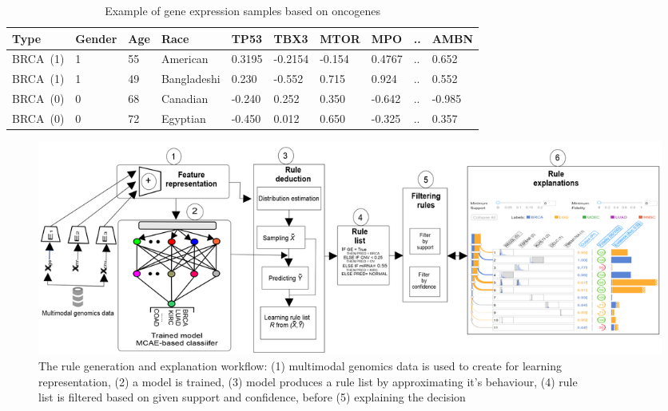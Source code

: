 \begin{table}[h!]
    \caption{Example of gene expression samples based on oncogenes}
    \label{ge:ancor_example}
    \vspace{-6mm}
    \begin{center}
        \scriptsize
        \begin{tabular}{l|l|l|l|l|l|l|l|l|l}
            \hline
            \rowcolor{Gray}
            \textbf{Type} & \textbf{Gender} & \textbf{Age} & \textbf{Race} & \textbf{TP53} & \textbf{TBX3} & \textbf{MTOR} & \textbf{MPO}  & .. & \textbf{AMBN} \\\hline    
            BRCA~(1) & 1 & 55 & American & 0.3195 & -0.2154 & -0.154 & 0.4767  & .. & 0.652 \\\hline
            BRCA~(1) & 1 & 49 & Bangladeshi & 0.230 &  -0.552  & 0.715  & 0.924   & .. & 0.552 \\\hline
            BRCA~(0) & 0 & 68 & Canadian & -0.240 &  0.252  & 0.350  & -0.642  & .. & -0.985 \\\hline
            BRCA~(0) & 0 & 72 & Egyptian & -0.450 &  0.012  & 0.650  & -0.325  & .. & 0.357 \\\hline
        \end{tabular}
        \vspace{-4mm}
    \end{center}
\end{table}


\begin{figure}
	\centering
		\includegraphics[scale=0.75]{images/rules_wf.png}
	    \caption[The rule generation and explanation workflow]{The rule generation and explanation workflow: (1) multimodal genomics data is used to create for learning\\ representation, (2) a model is trained, (3) model produces a rule list by approximating it's behaviour, (4) rule\\ list is filtered based on given support and confidence, before (5) explaining the decision} 
	    \label{fig:rules_wf}
\end{figure}

